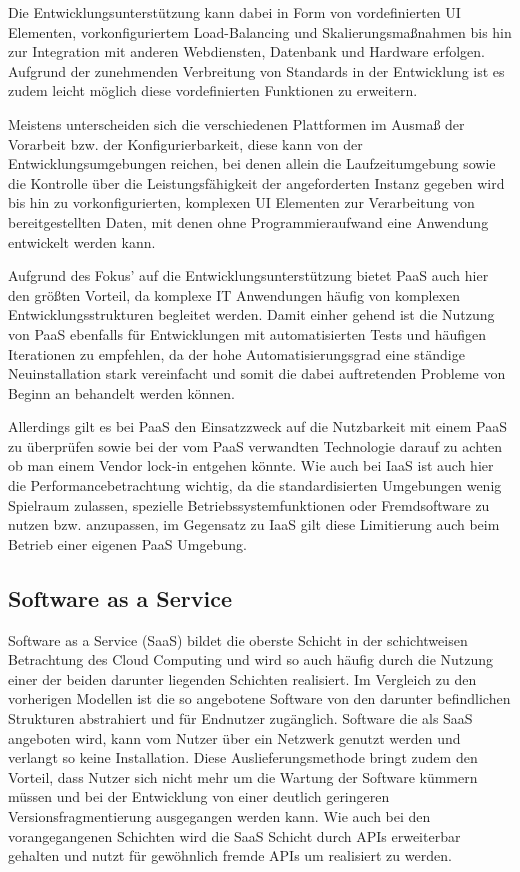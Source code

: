 Die Entwicklungsunterstützung kann dabei in Form von vordefinierten UI Elementen, vorkonfiguriertem Load-Balancing und Skalierungsmaßnahmen bis hin zur Integration mit anderen Webdiensten, Datenbank und Hardware erfolgen. Aufgrund der zunehmenden Verbreitung von Standards in der Entwicklung ist es zudem leicht möglich diese vordefinierten Funktionen zu erweitern. 

Meistens unterscheiden sich die verschiedenen Plattformen im Ausmaß der Vorarbeit bzw. der Konfigurierbarkeit, diese kann von der Entwicklungsumgebungen reichen, bei denen allein die Laufzeitumgebung sowie die Kontrolle über die Leistungsfähigkeit der angeforderten Instanz gegeben wird bis hin zu vorkonfigurierten, komplexen UI Elementen zur Verarbeitung von bereitgestellten Daten, mit denen ohne Programmieraufwand eine Anwendung entwickelt werden kann.

Aufgrund des Fokus' auf die Entwicklungsunterstützung bietet PaaS auch hier den größten Vorteil, da komplexe IT Anwendungen häufig von komplexen Entwicklungsstrukturen begleitet werden. Damit einher gehend ist die Nutzung von PaaS ebenfalls für Entwicklungen mit automatisierten Tests und häufigen Iterationen zu empfehlen, da der hohe Automatisierungsgrad eine ständige Neuinstallation stark vereinfacht und somit die dabei auftretenden Probleme von Beginn an behandelt werden können.

Allerdings gilt es bei PaaS den Einsatzzweck auf die Nutzbarkeit mit einem PaaS zu überprüfen sowie bei der vom PaaS verwandten Technologie darauf zu achten ob man einem Vendor lock-in entgehen könnte. Wie auch bei IaaS ist auch hier die Performancebetrachtung wichtig, da die standardisierten Umgebungen wenig Spielraum zulassen, spezielle Betriebssystemfunktionen oder Fremdsoftware zu nutzen bzw. anzupassen, im Gegensatz zu IaaS gilt diese Limitierung auch beim Betrieb einer eigenen PaaS Umgebung. \cite{technet} \cite{rackSpace} \cite{ibm2011}

\subsection{Software as a Service}
Software as a Service (SaaS) bildet die oberste Schicht in der schichtweisen Betrachtung des Cloud Computing und wird so auch häufig durch die Nutzung einer der beiden darunter liegenden Schichten realisiert. Im Vergleich zu den vorherigen Modellen ist die so angebotene Software von den darunter befindlichen Strukturen abstrahiert und für Endnutzer zugänglich. Software die als SaaS angeboten wird, kann vom Nutzer über ein Netzwerk genutzt werden und verlangt so keine Installation. Diese Auslieferungsmethode bringt zudem den Vorteil, dass Nutzer sich nicht mehr um die Wartung der Software kümmern müssen und bei der Entwicklung von einer deutlich geringeren Versionsfragmentierung ausgegangen werden kann. Wie auch bei den vorangegangenen Schichten wird die SaaS Schicht durch APIs erweiterbar gehalten und nutzt für gewöhnlich fremde APIs um realisiert zu werden.

